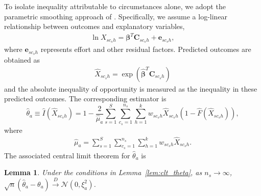\documentclass[12pt]{article}
\theoremstyle{plain}
\newtheorem{lemma}{Lemma}
\theoremstyle{definition}
\begin{document}
To isolate inequality attributable to circumstances alone, we adopt the parametric smoothing approach of \citet{ferreira2011measurement}. Specifically, we assume a log-linear relationship between outcomes and explanatory variables,
\begin{align}
\label{eq:param_eq}
    \ln X_{sc_sh}=\bm{\beta}^T\bm{C}_{sc_sh} + \bm{e}_{sc_sh}, 
\end{align}
where $\bm{e}_{sc_sh}$ represents effort and other residual factors. Predicted outcomes are obtained as
\begin{align}
\label{eq:smoothed_eq}
    \hat{X}_{sc_sh} = \exp\left(\hat{\bm{\beta}}^T\bm{C}_{sc_sh}\right)
\end{align}
and the absolute inequality of opportunity is measured as the inequality in these predicted outcomes. The corresponding estimator is
\begin{equation}
\hat{\theta}_a\equiv \hat{I}(\hat{X}_{sc_sh}) = 1 - \frac{2}{\hat{\mu}_a} \sum_{s=1}^{S} \sum_{c_s=1}^{n_s} 
\sum_{h=1}^{k} w_{sc_sh}\hat{X}_{sc_sh} \left( 1 - \hat{F}\left(\hat{X}_{sc_sh}\right) 
\right), 
\label{eq:IOP1Est}
\end{equation}
where
\begin{align}
\hat{\mu}_a=\sum_{s=1}^{S} \sum_{c_s=1}^{n_s} 
\sum_{h=1}^{k} w_{sc_sh}\hat{X}_{sc_sh}.
\end{align}
The associated central limit theorem for $\hat{\theta}_a$ is
\begin{lemma}
\label{lem:clt_theta_a}
Under the conditions in Lemma~\ref{lem:clt_theta}, as $n_s\to\infty$, 
$\sqrt n(\hat\theta_a-\theta_a)\xrightarrow{D}\mathcal N(0,\xi_a^2)$.
\end{lemma}
\end{document}
